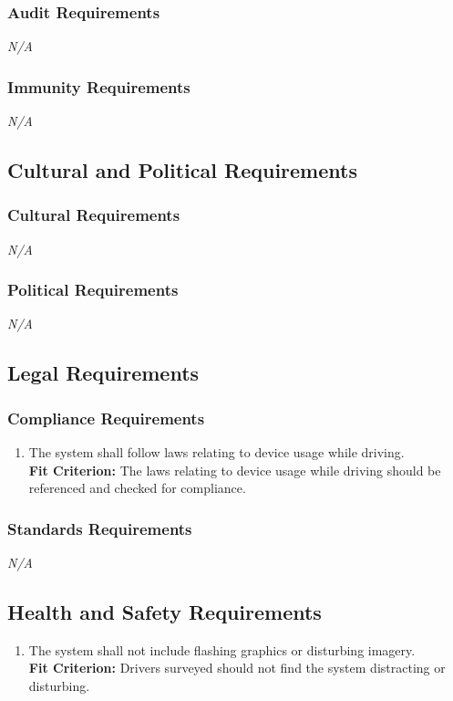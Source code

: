 \documentclass[12pt,letterpaper]{article}
\begin{document}
\subsubsection{Audit Requirements}
\noindent \emph{N/A}

\subsubsection{Immunity Requirements}
\noindent \emph{N/A}

\subsection{Cultural and Political Requirements}
\subsubsection{Cultural Requirements}
\noindent \emph{N/A}

\subsubsection{Political Requirements}
\noindent \emph{N/A}

\subsection{Legal Requirements}
\subsubsection{Compliance Requirements}
\begin{enumerate}[{LR}1.] 
    \item The system shall follow laws relating to device usage while driving.\\
    \textbf{Fit Criterion:} The laws relating to device usage while driving should be referenced and checked for compliance.
\end{enumerate}
\subsubsection{Standards Requirements}
\noindent \emph{N/A}

\subsection{Health and Safety Requirements}
\begin{enumerate}[{HS}1.] 
    \item The system shall not include flashing graphics or disturbing imagery.\\
    \textbf{Fit Criterion:} Drivers surveyed should not find the system distracting or disturbing.
\end{enumerate}
\end{document}
